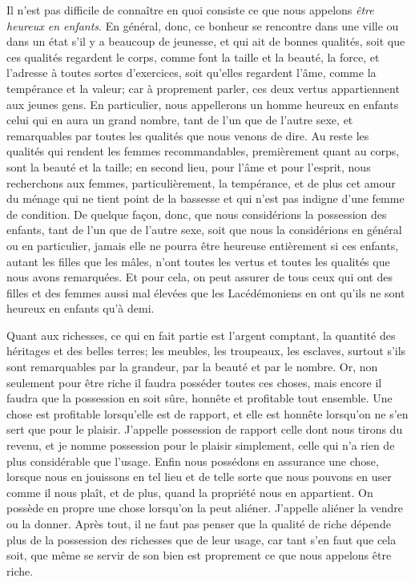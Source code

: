 \bigbreak

Il n'est pas difficile de connaître en quoi consiste ce que nous appelons \emph{être heureux en enfants}. En général, donc,
ce bonheur se rencontre dans une ville ou dans un état s'il y a beaucoup de jeunesse, et qui ait de bonnes qualités, soit
que ces qualités regardent le corps, comme font la taille et la beauté, la force, et l'adresse à toutes sortes d'exercices,
soit qu'elles regardent l’âme, comme la tempérance et la valeur; car à proprement parler, ces deux vertus appartiennent aux
jeunes gens. En particulier, nous appellerons un homme heureux en enfants celui qui en aura un grand nombre, tant de l'un que
de l'autre sexe, et remarquables par toutes les qualités que nous venons de dire. Au reste les qualités qui rendent les femmes
recommandables, premièrement quant au corps, sont la beauté et la taille; en second lieu, pour l’âme et pour l'esprit, nous
recherchons aux femmes, particulièrement, la tempérance, et de plus cet amour du ménage qui ne tient point de la bassesse et
qui n'est pas indigne d'une femme de condition. De quelque façon, donc, que nous considérions la possession des enfants, tant
de l'un que de l'autre sexe, soit que nous la considérions en général ou en particulier, jamais elle ne pourra être heureuse
entièrement si ces enfants, autant les filles que les mâles, n'ont toutes les vertus et toutes les qualités que nous avons
remarquées. Et pour cela, on peut assurer de tous ceux qui ont des filles et des femmes aussi mal élevées que les Lacédémoniens
en ont qu'ils ne sont heureux en enfants qu'à demi.

\bigbreak

Quant aux richesses, ce qui en fait partie est l'argent comptant, la quantité des héritages et des belles terres; les meubles,
les troupeaux, les esclaves, surtout s'ils sont remarquables par la grandeur, par la beauté et par le nombre. Or, non seulement
pour être riche il faudra posséder toutes ces choses, mais encore il faudra que la possession en soit sûre, honnête et profitable
tout ensemble. Une chose est profitable lorsqu'elle est de rapport, et elle est honnête lorsqu'on ne s'en sert que pour le plaisir.
J'appelle possession de rapport celle dont nous tirons du revenu, et je nomme possession pour le plaisir simplement, celle qui n'a
rien de plus considérable que l'usage. Enfin nous possédons en assurance une chose, lorsque nous en jouissons en tel lieu et de
telle sorte que nous pouvons en user comme il nous plaît, et de plus, quand la propriété nous en appartient. On possède en propre une
chose lorsqu'on la peut aliéner. J'appelle aliéner la vendre ou la donner. Après tout, il ne faut pas penser que la qualité de riche
dépende plus de la possession des richesses que de leur usage, car tant s'en faut que cela soit, que même se servir de son bien est
proprement ce que nous appelons être riche.

